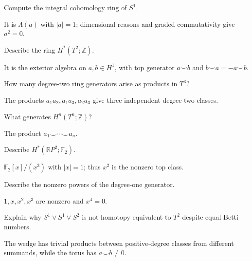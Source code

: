 \begin{problem}[Circle]\label{prob:viii29-04}
Compute the integral cohomology ring of \(S^1\).
\end{problem}
\begin{solution}
It is \(\Lambda(a)\) with \(|a|=1\); dimensional reasons and graded commutativity give \(a^2=0\).
\end{solution}

\begin{problem}[Torus]\label{prob:viii29-05}
Describe the ring \(H^*(T^2;\mathbb Z)\).
\end{problem}
\begin{solution}
It is the exterior algebra on \(a,b\in H^1\), with top generator \(a\smile b\) and \(b\smile a=-a\smile b\).
\end{solution}

\begin{problem}\label{prob:viii29-06}
How many degree-two ring generators arise as products in \(T^3\)?
\end{problem}
\begin{solution}
The products \(a_1a_2,a_1a_3,a_2a_3\) give three independent degree-two classes.
\end{solution}

\begin{problem}\label{prob:viii29-07}
What generates \(H^n(T^n;\mathbb Z)\)?
\end{problem}
\begin{solution}
The product \(a_1\smile\cdots\smile a_n\).
\end{solution}

\begin{problem}[RP2 mod2]\label{prob:viii29-08}
Describe \(H^*(\mathbb RP^2;\mathbb F_2)\).
\end{problem}
\begin{solution}
\(\mathbb F_2[x]/(x^3)\) with \(|x|=1\); thus \(x^2\) is the nonzero top class.
\end{solution}

\begin{problem}[RP3 mod2]\label{prob:viii29-09}
Describe the nonzero powers of the degree-one generator.
\end{problem}
\begin{solution}
\(1,x,x^2,x^3\) are nonzero and \(x^4=0\).
\end{solution}

\begin{problem}\label{prob:viii29-10}
Explain why \(S^1\vee S^1\vee S^2\) is not homotopy equivalent to \(T^2\) despite equal Betti numbers.
\end{problem}
\begin{solution}
The wedge has trivial products between positive-degree classes from different summands, while the torus has \(a\smile b\ne0\).
\end{solution}

